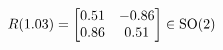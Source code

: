 \documentclass[preview]{standalone}
\begin{document}
\begin{align*}
\special{dvisvgm:raw <g id='unique000'>}R(1.03) = \begin{bmatrix} 0.51 & -0.86 \\ 0.86 & 0.51 \end{bmatrix} \in \text{SO}(2)\special{dvisvgm:raw </g>}
\end{align*}
\end{document}
